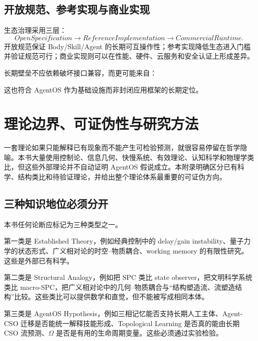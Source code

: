 \section{开放规范、参考实现与商业实现}

生态治理采用三层：
\[
OpenSpecification
\rightarrow
ReferenceImplementation
\rightarrow
CommercialRuntime.
\]
开放规范保证 Body/Skill/Agent 的长期可互操作性；参考实现降低生态进入门槛并验证规范可行；商业实现则可以在性能、硬件、云服务和安全认证上形成差异。

长期壁垒不应依赖破坏接口兼容，而更可能来自：
\begin{statementbox}
\centering
{}
\end{statementbox}
这也符合 AgentOS 作为基础设施而非封闭应用框架的长期定位。


\chapter{理论边界、可证伪性与研究方法}
\label{app:falsifiability}

\begin{chapterlead}
一套理论如果只能解释已有现象而不能产生可检验预测，就很容易停留在哲学隐喻。本书大量使用控制论、信息几何、快慢系统、有效理论、认知科学和物理学类比，但这些外部理论并不自动证明 AgentOS 假说成立。本附录明确区分已有科学、结构类比和待验证理论，并给出整个理论体系最重要的可证伪方向。
\end{chapterlead}

\section{三种知识地位必须分开}

本书任何论断应标记为三种类型之一。

第一类是 Established Theory，例如经典控制中的 delay/gain instability、量子力学的状态形式、广义相对论的时空--物质耦合、working memory 的有限性研究。这些是外部已有科学。

第二类是 Structural Analogy，例如把 SPC 类比 state observer，把文明科学系统类比 macro-SPC，把广义相对论中的几何--物质耦合与“结构塑造流、流塑造结构”比较。这些类比可以提供数学和直觉，但不能被写成相同本体。

第三类是 AgentOS Hypothesis，例如三相记忆能否支持长期人工主体、Agent-CSO 迁移是否能统一解释技能形成、Topological Learning 是否真的能由长期 CSO 流预测、$\Omega$ 是否是有用的生命周期变量。这些必须通过实验检验。

